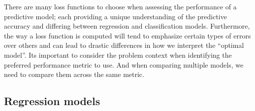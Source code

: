 \documentclass[]{krantz}
\begin{document}
There are many loss functions to choose when assessing the performance of a predictive model; each providing a unique understanding of the predictive accuracy and differing between regression and classification models. Furthermore, the way a loss function is computed will tend to emphasize certain types of errors over others and can lead to drastic differences in how we interpret the ``optimal model''. Its important to consider the problem context when identifying the preferred performance metric to use. And when comparing multiple models, we need to compare them across the same metric.

\hypertarget{regression-models}{%
\subsection{Regression models}\label{regression-models}}
\end{document}
